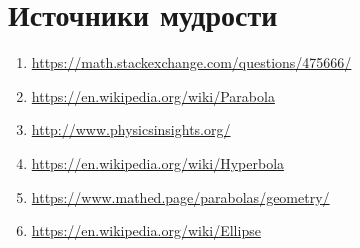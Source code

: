 \documentclass[12pt]{article}
\theoremstyle{definition}
\begin{document}
\section{Источники мудрости}


\begin{enumerate}
\item \url{https://math.stackexchange.com/questions/475666/}
\item \url{https://en.wikipedia.org/wiki/Parabola}
\item \url{http://www.physicsinsights.org/}
\item \url{https://en.wikipedia.org/wiki/Hyperbola}
\item \url{https://www.mathed.page/parabolas/geometry/}
\item \url{https://en.wikipedia.org/wiki/Ellipse}
\end{enumerate}

\printbibliography[heading=none]
\end{document}

